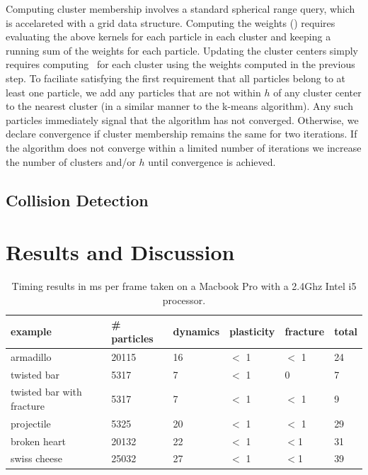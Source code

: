 \documentclass[review]{acmsiggraph}
\begin{document}
Computing cluster membership involves a standard spherical range query, which is accelareted with a grid data structure.  Computing the weights 
() requires evaluating the above 
kernels for each particle in each cluster and keeping a running sum of the weights for each particle.  Updating the cluster centers simply requires 
computing~ for each cluster using the weights computed in the previous step.  To faciliate satisfying the first requirement that 
all particles belong to at least one particle, we add any particles that are not within $h$ of any cluster center to the nearest cluster 
(in a similar manner to the k-means algorithm).  Any such particles immediately signal that the algorithm has not converged.  Otherwise,
we declare convergence if cluster membership remains the same for two iterations.   If the algorithm
does not converge within a limited number of iterations we increase the number of clusters and/or $h$ until convergence is achieved.


\subsection{Collision Detection}

\section{Results and Discussion}

\begin{table}
\begin{center}
\caption{Timing results in ms per frame taken on a Macbook Pro with a 2.4Ghz Intel i5 processor.}
\label{table:timing}
\begin{tabular}{|l|l|l|l|l|l|}
\hline
example & \# particles & dynamics & plasticity & fracture & total\\
\hline
armadillo & 20115 & 16  & $<$ 1 & $<$ 1 & 24\\
twisted bar & 5317 & 7 & $<$ 1  & 0 & 7\\
twisted bar with fracture & 5317 & 7  & $<$ 1 & $<$ 1 & 9 \\
projectile & 5325 & 20 & $<$ 1 & $<$ 1 & 29\\
broken heart & 20132 & 22 & $<$ 1 & $<$1 & 31\\
swiss cheese & 25032 & 27 & $<$ 1 & $<$1 & 39 \\
\hline
\end{tabular}
\end{center}
\end{table}
\end{document}
